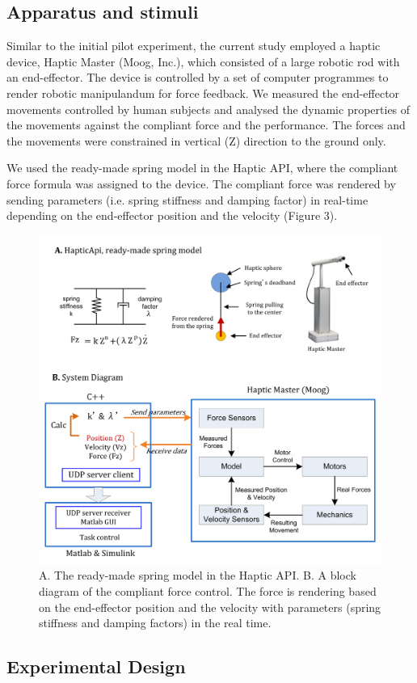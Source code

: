 \subsection{Apparatus and stimuli}
Similar to the initial pilot experiment, the current study employed a haptic device, Haptic Master (Moog, Inc.), which consisted of a large robotic rod with an end-effector. The device is controlled by a set of computer programmes to render robotic manipulandum for force feedback. We measured the end-effector movements controlled by human subjects and analysed the dynamic properties of the movements against the compliant force and the performance. The forces and the movements were constrained in vertical (Z) direction to the ground only.

We used the ready-made spring model in the Haptic API, where the compliant force formula was assigned to the device. The compliant force was rendered by sending parameters (i.e. spring stiffness and damping factor) in real-time depending on the end-effector position and the velocity (Figure 3).

%
\begin{figure}
	\centering
	\includegraphics[width=.7\textwidth]{Chie/figs/Figure3.png}
	\caption{A. The ready-made spring model in the Haptic API. B. A block diagram of the compliant force control. The force is rendering based on the end-effector position and the velocity with parameters (spring stiffness and damping factors) in the real time.}
	\label{modelling}
\end{figure}

\subsection{Experimental Design}

